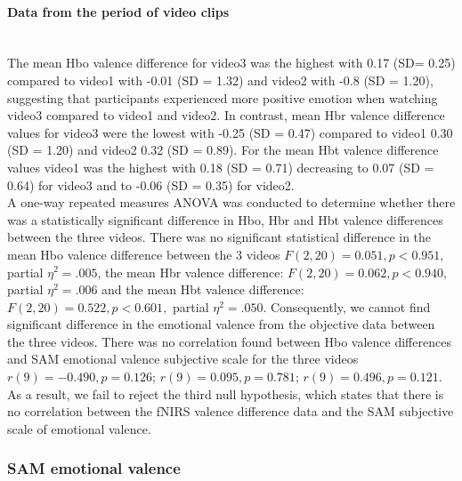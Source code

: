 \documentclass[a4paper]{report}
\begin{document}
			\paragraph{Data from the period of video clips}\leavevmode\\
				The mean Hbo valence difference for video3 was the highest with 0.17 (SD= 0.25) compared to video1 with -0.01 (SD = 1.32) and video2 with -0.8 (SD = 1.20), suggesting that participants experienced more positive emotion when watching video3 compared to video1 and video2. In contrast, mean Hbr valence difference values for video3 were the lowest with -0.25 (SD = 0.47) compared to video1 0.30 (SD = 1.20) and video2 0.32 (SD = 0.89). For the mean Hbt valence difference values video1 was the highest with 0.18 (SD = 0.71) decreasing to 0.07 (SD = 0.64) for video3 and to -0.06 (SD = 0.35) for video2.\\
				A one-way repeated measures ANOVA was conducted to determine whether there was a statistically significant difference in Hbo, Hbr and Hbt valence differences between the three videos. There was no significant statistical difference in the mean Hbo valence difference between the 3 videos $F(2,20)=0.051, p<0.951,$ partial $\eta^{2}=.005$, the mean Hbr valence difference: $F(2,20)=0.062, p<0.940,$ partial $\eta^{2}=.006$ and the mean Hbt valence difference: $F(2,20)=0.522, p<0.601,$ partial $\eta^{2}=.050$. Consequently, we cannot find significant difference in the emotional valence from the objective data between the three videos.
				There was no correlation found between Hbo valence differences and SAM emotional valence subjective scale for the three videos $r(9)=-0.490, p=0.126$; $r(9)=0.095, p=0.781$; $r(9)=0.496, p=0.121$. As a result, we fail to reject the third null hypothesis, which states that there is no correlation between the fNIRS valence difference data and the SAM subjective scale of emotional valence.

			\subsubsection{SAM emotional valence}
\end{document}
